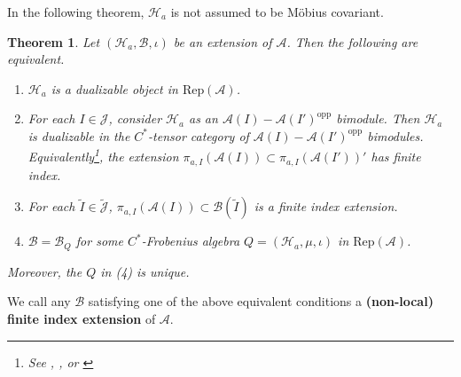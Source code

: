 \documentclass[11pt,b5paper,notitlepage]{article}
\theoremstyle{definition}
\theoremstyle{plain}
\newtheorem{thm}[df]{Theorem}
\newcommand{\mc}{\mathcal}
\newcommand{\wtd}{\widetilde}
\newcommand{\opp}{\mathrm{opp}}
\newcommand{\Jtd}{\widetilde{\mathcal J}}
\newcommand{\RepA}{\mathrm{Rep}(\mathcal A)}
\numberwithin{equation}{section}
\begin{document}
In the following theorem, $\mc H_a$ is not assumed to be M\"obius covariant. 


\begin{thm}\label{lb11}
Let $(\mc H_a,\mc B,\iota)$ be an extension of $\mc A$. Then the following are equivalent.
\begin{enumerate}[label=(\arabic*)]
\item $\mc H_a$ is a dualizable object in $\RepA$.
\item For each $I\in\mc J$, consider $\mc H_a$ as an $\mc A(I)-\mc A(I')^\opp$ bimodule. Then  $\mc H_a$ is dualizable in the $C^*$-tensor category of $\mc A(I)-\mc A(I')^\opp$ bimodules. Equivalently\footnote{See \cite{Lon90}, \cite[Sec. 2.7]{LR95}, or \cite[Sec. 7]{BDH14}}, the extension $\pi_{a,I}(\mc A(I))\subset \pi_{a,I}(\mc A(I'))'$ has finite index.
\item For each $\wtd I \in\Jtd$, $\pi_{a,I}(\mc A(I))\subset\mc B(\wtd I)$ is a finite index extension.
\item $\mc B=\mc B_Q$ for some $C^*$-Frobenius algebra $Q=(\mc H_a,\mu,\iota)$ in $\RepA$.
\end{enumerate} 	
Moreover, the $Q$ in (4) is unique.
\end{thm}	

We call any $\mc B$ satisfying one of the above equivalent conditions a \textbf{(non-local) finite index extension} of $\mc A$.
\end{document}
